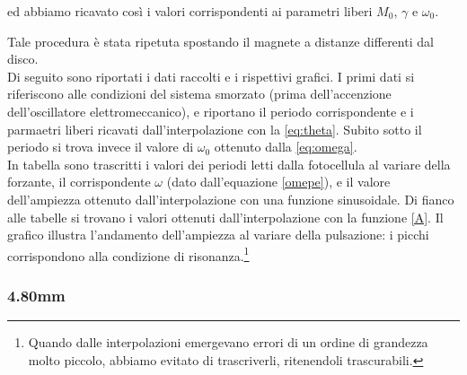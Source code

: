 ed abbiamo ricavato così i valori corrispondenti ai parametri liberi $M_0$, $\gamma$ e $\omega_0$. 

Tale procedura è stata ripetuta spostando il magnete a distanze differenti dal disco.
\\
Di seguito sono riportati i dati raccolti e i rispettivi grafici. I primi dati si riferiscono alle condizioni del sistema smorzato (prima dell'accenzione dell'oscillatore elettromeccanico), e riportano il periodo corrispondente e i parmaetri liberi ricavati dall'interpolazione con la \ref{eq:theta}. Subito sotto il periodo si trova invece il valore di $\omega_0$ ottenuto dalla \ref{eq:omega}. \\In tabella sono trascritti i valori dei periodi letti dalla fotocellula al variare della forzante, il corrispondente $\omega$ (dato dall'equazione \ref{omepe}), e il valore dell'ampiezza ottenuto dall'interpolazione con una funzione sinusoidale. Di fianco alle tabelle si trovano i valori ottenuti dall'interpolazione con la funzione \ref{A}. Il grafico illustra l'andamento dell'ampiezza al variare della pulsazione: i picchi corrispondono alla condizione di risonanza.\footnote{Quando dalle interpolazioni emergevano errori di un ordine di grandezza molto piccolo, abbiamo evitato di trascriverli, ritenendoli trascurabili.}

\subsubsection{4.80mm}

